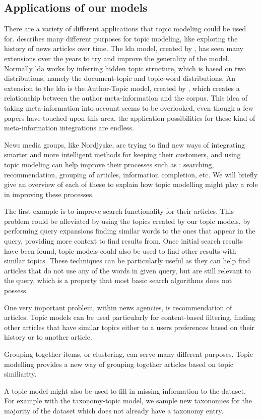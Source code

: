 \subsection{Applications of our models}\label{sec:appendix_applications}
There are a variety of different applications that topic modeling could be used for. 
\citet{Probabilistic_Topic_Models} describes many different purposes for topic modeling, like exploring the history of news articles over time.
The \gls{lda} model, created by \citet{blei2003latent}, has seen many extensions over the years to try and improve the generality of the model.
Normally \gls{lda} works by inferring hidden topic structure, which is based on two distributions, namely the document-topic and topic-word distributions.
An extension to the \gls{lda} is the Author-Topic model, created by \citet{author_topic_2012}, which creates a relationship between the author meta-information and the corpus.
This idea of taking meta-information into account seems to be overlooked, even though a few papers have touched upon this area, the application possibilities for these kind of meta-information integrations are endless.

News media groups, like Nordjyske, are trying to find new ways of integrating smarter and more intelligent methods for keeping their customers, and using topic modeling can help improve their processes such as : searching, recommendation, grouping of articles, information completion, etc.
We will briefly give an overview of each of these to explain how topic modelling might play a role in improving these processes.

The first example is to improve search functionality for their articles.
This problem could be alleviated by using the topics created by our topic models, by performing query expansions finding similar words to the ones that appear in the query, providing more context to find results from.
Once initial search results have been found, topic models could also be used to find other results with similar topics.
These techniques can be particularly useful as they can help find articles that do not use any of the words in given query, but are still relevant to the query, which is a property that most basic search algorithms does not possess.

One very important problem, within news agencies, is recommendation of articles.
Topic models can be used particularly for content-based filtering, finding other articles that have similar topics either to a users preferences based on their history or to another article.

Grouping together items, or clustering, can serve many different purposes. Topic modelling provides a new way of grouping together articles based on topic similiarity.

A topic model might also be used to fill in missing information to the dataset.
For example with the taxonomy-topic model, we sample new taxonomies for the majority of the dataset which does not already have a taxonomy entry.